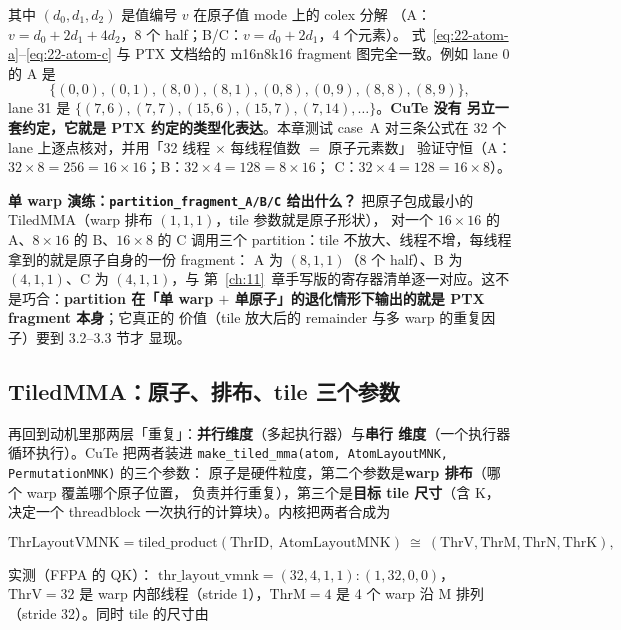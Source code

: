其中 $(d_0,d_1,d_2)$ 是值编号 $v$ 在原子值 mode 上的 colex 分解
（A：$v=d_0+2d_1+4d_2$，8 个 half；B/C：$v=d_0+2d_1$，4 个元素）。
式~\eqref{eq:22-atom-a}--\eqref{eq:22-atom-c} 与 PTX 文档给的 m16n8k16
fragment 图完全一致。例如 lane 0 的 A 是
\begin{equation*}
  \{(0,0),(0,1),(8,0),(8,1),(0,8),(0,9),(8,8),(8,9)\},
\end{equation*}
lane 31 是 $\{(7,6),(7,7),(15,6),(15,7),(7,14),\dots\}$。\textbf{CuTe 没有
另立一套约定，它就是 PTX 约定的类型化表达}。本章测试 case~A 对三条公式在
32 个 lane 上逐点核对，并用「32 线程 $\times$ 每线程值数 $=$ 原子元素数」
验证守恒（A：$32\times8=256=16\times16$；B：$32\times4=128=8\times16$；
C：$32\times4=128=16\times8$）。

\textbf{单 warp 演练：\texttt{partition\_\allowbreak{}fragment\_\allowbreak{}A/\allowbreak{}B/\allowbreak{}C} 给出什么？}
把原子包成最小的 TiledMMA（warp 排布 $(1,1,1)$，tile 参数就是原子形状），
对一个 $16\times16$ 的 A、$8\times16$ 的 B、$16\times8$ 的 C 调用三个
partition：tile 不放大、线程不增，每线程拿到的就是原子自身的一份 fragment：
A 为 $(8,1,1)$（8 个 half）、B 为 $(4,1,1)$、C 为 $(4,1,1)$，与
第~\ref{ch:11}~章手写版的寄存器清单逐一对应。这不是巧合：\textbf{partition
在「单 warp $+$ 单原子」的退化情形下输出的就是 PTX fragment 本身}；它真正的
价值（tile 放大后的 remainder 与多 warp 的重复因子）要到 3.2--3.3 节才
显现。

\subsection{TiledMMA：原子、排布、tile 三个参数}

再回到动机里那两层「重复」：\textbf{并行维度}（多起执行器）与\textbf{串行
维度}（一个执行器循环执行）。CuTe 把两者装进
\texttt{make\_\allowbreak{}tiled\_\allowbreak{}mma\allowbreak{}(atom,\allowbreak{} Atom\allowbreak{}Layout\allowbreak{}MNK,\allowbreak{} Permutation\allowbreak{}MNK)} 的三个参数：
原子是硬件粒度，第二个参数是\textbf{warp 排布}（哪个 warp 覆盖哪个原子位置，
负责并行重复），第三个是\textbf{目标 tile 尺寸}（含 K，决定一个 threadblock
一次执行的计算块）。内核把两者合成为

\begin{equation}
  \mathrm{ThrLayoutVMNK} = \mathrm{tiled\_product}(\mathrm{ThrID},\
  \mathrm{AtomLayoutMNK}) \ \cong\ (\mathrm{ThrV},\mathrm{ThrM},
  \mathrm{ThrN},\mathrm{ThrK}) ,
  \label{eq:22-thr-vmnk}
\end{equation}

实测（FFPA 的 QK）：
$\mathrm{thr\_layout\_vmnk} = (32,4,1,1){:}(1,32,0,0)$，$\mathrm{ThrV}=32$
是 warp 内部线程（stride 1），$\mathrm{ThrM}=4$ 是 4 个 warp 沿 M 排列
（stride 32）。同时 tile 的尺寸由

